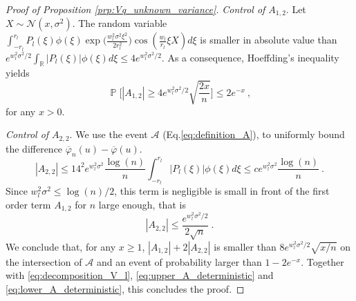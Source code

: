 \documentclass[twoside,11pt]{article}
\def\beq{\begin{equation}}
\def\eeq{\end{equation}}
\def\cA{\mathcal{A}}
\def\cN{\mathcal{N}}
\renewcommand{\P}{\operatorname{\mathbb{P}}}
\newcommand{\<}{\langle}
\renewcommand{\>}{\rangle}
\begin{document}
\begin{proof}[Proof of Proposition \ref{prp:Vq_unknown_variance}]
\noindent 
{\it Control of $A_{1,2}$}. Let $X\sim \cN(x,\sigma^2)$. The random variable 
 $\int_{-r_l}^{r_l} P_l(\xi) \phi(\xi) \exp\big(\frac{w_l^2\sigma^2\xi^2}{2r_l^2}\big)\cos(\frac{w_l}{r_l}\xi X)d\xi$ is smaller in absolute value than $e^{w_l^2 \sigma^2/2}\int_{\mathbb{R}}|P_l(\xi)|\phi(\xi)d\xi\leq 4e^{w_l^2 \sigma^2/2}$. As a consequence, Hoeffding's inequality yields 
 \[
  \P\Big[|A_{1,2}|\geq  4 e^{w_l^2 \sigma^2/2} \sqrt{\frac{2x}{n}} \Big]\leq 2e^{-x}\ ,
 \]
for any $x>0$.



\bigskip 

\noindent 
{\it Control of $A_{2,2}$}. We use the event $\cA$ (Eq.\eqref{eq:definition_A}), to uniformly bound the difference $\overline{\varphi}_n(u)- \overline{\varphi}(u)$.
\beq
|A_{2,2}|\leq 14^2  e^{w_l^2\sigma^2}\frac{\log(n)}{n}    \int_{-r_l}^{r_l} |P_l(\xi)|\phi(\xi)d\xi\leq c e^{w_l^2\sigma^2}\frac{\log(n)}{n}\ .
\eeq
Since $w_l^2\sigma^2\leq \log(n)/2$, this term is negligible is small in front of the first order term $A_{1,2}$ for $n$ large enough, that is 
\[|A_{2,2}|\leq \frac{e^{w_l^2 \sigma^2/2}}{2\sqrt{n}}\ .\]
We conclude that, for any $x \geq 1$,  $|A_{1,2}|+2|A_{2,2}|$ is smaller than $8e^{w_l^2 \sigma^2/2} \sqrt{x/n}$ on the intersection of $\cA$ and an event of probability larger than $1-2e^{-x}$. Together with \eqref{eq:decomposition_V_l}, \eqref{eq:upper_A_deterministic} and \eqref{eq:lower_A_deterministic}, this concludes the proof.


\end{proof}
\end{document}
